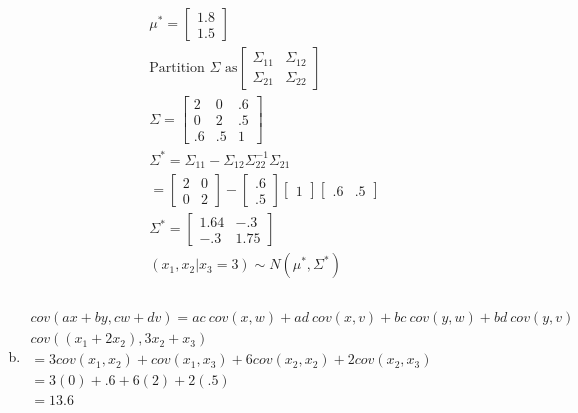 \documentclass{article}
\begin{document}
\begin{flushleft}
\begin{enumerate}[(a)]
\begin{multline*}
\mu^*=\begin{bmatrix}
1.8\\
1.5
\end{bmatrix}\\
\text{Partition } \Sigma \text{ as} \begin{bmatrix}
\Sigma_{11} & \Sigma_{12}\\
\Sigma_{21} & \Sigma_{22}
\end{bmatrix}\\
\Sigma=\left[\begin{array}{cc|c}
2 & 0 &.6 \\ 
0 & 2 &.5\\
\hline
.6 & .5&1
\end{array}\right]\\
\Sigma^*=\Sigma_{11}-\Sigma_{12}\Sigma_{22}^{-1}\Sigma_{21}\\
=\begin{bmatrix}
2&0\\
0&2
\end{bmatrix}-\begin{bmatrix}
.6\\
.5
\end{bmatrix}\begin{bmatrix}
1
\end{bmatrix}\begin{bmatrix}
.6&.5
\end{bmatrix}\\
\Sigma^*=\begin{bmatrix}
1.64 & -.3\\
-.3 & 1.75
\end{bmatrix}\\
(x_1,x_2|x_3=3)\sim N(\mu^*,\Sigma^*)\\
\end{multline*}

	\item 
\begin{multline*}\\
cov(ax+by,cw+dv)=ac \ cov(x,w)+ ad \ cov(x,v)+ bc \ cov(y,w)+ bd \ cov(y,v)\\
cov((x_1+2x_2),3x_2+x_3)\\
=3cov(x_1,x_2)+cov(x_1,x_3)+6cov(x_2,x_2)+2cov(x_2,x_3)\\
=3(0)+.6+6(2)+2(.5)\\
=13.6\\
\end{multline*}
	
\end{enumerate}


\end{flushleft}
\end{document}
